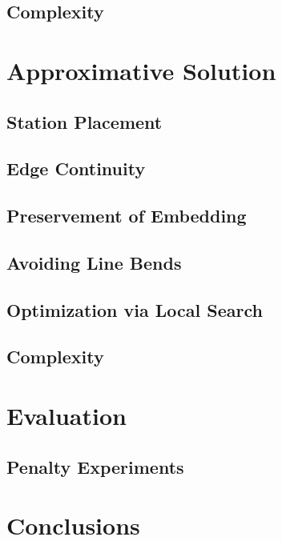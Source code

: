 \documentclass{sig-alternate-sigmod09}
\begin{document}
\subsection{Complexity}

\section{Approximative Solution}

\subsection{Station Placement}

\subsection{Edge Continuity}

\subsection{Preservement of Embedding}

\subsection{Avoiding Line Bends}

\subsection{Optimization via Local Search}

\subsection{Complexity}

\section{Evaluation}

\subsection{Penalty Experiments}

\section{Conclusions}


\balancecolumns
\end{document}
